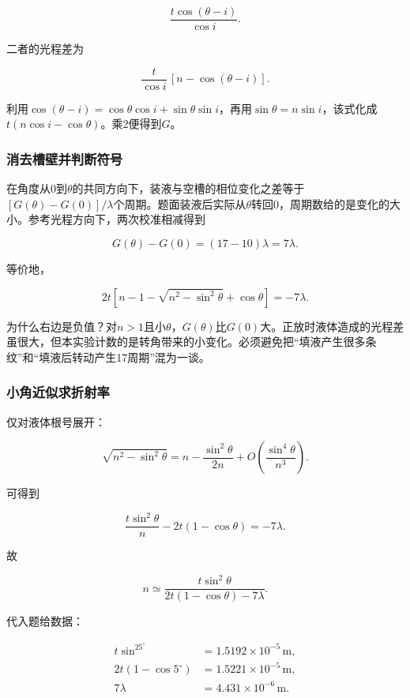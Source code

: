 \documentclass[12pt,a4paper,fontset=fandol]{ctexart}
\begin{document}
\[
\frac{t\cos(\theta-i)}{\cos i}.
\]

二者的光程差为

\[
\frac{t}{\cos i}\,[n-\cos(\theta-i)].
\]

利用\(\cos(\theta-i)=\cos\theta\cos i+\sin\theta\sin i\)，再用\(\sin\theta=n\sin i\)，该式化成\(t(n\cos i-\cos\theta)\)。乘2便得到\(G\)。

\subsubsection{消去槽壁并判断符号}\label{ux6d88ux53bbux69fdux58c1ux5e76ux5224ux65adux7b26ux53f7}

在角度从0到\(\theta\)的共同方向下，装液与空槽的相位变化之差等于\([G(\theta)-G(0)]/\lambda\)个周期。题面装液后实际从\(\theta\)转回0，周期数给的是变化的大小。参考光程方向下，两次校准相减得到

\[
G(\theta)-G(0)=(17-10)\lambda=7\lambda.
\]

等价地，

\[
2t\left[n-1-\sqrt{n^2-\sin^2\theta}
+\cos\theta\right]=-7\lambda.
\]

为什么右边是负值？对\(n>1\)且小\(\theta\)，\(G(\theta)\)比\(G(0)\)大。正放时液体造成的光程差虽很大，但本实验计数的是转角带来的小变化。必须避免把``填液产生很多条纹''和``填液后转动产生17周期''混为一谈。

\subsubsection{小角近似求折射率}\label{ux5c0fux89d2ux8fd1ux4f3cux6c42ux6298ux5c04ux7387}

仅对液体根号展开：

\[
\sqrt{n^2-\sin^2\theta}
=n-\frac{\sin^2\theta}{2n}
+O\!\left(\frac{\sin^4\theta}{n^3}\right).
\]

可得到

\[
\frac{t\sin^2\theta}{n}
-2t(1-\cos\theta)=-7\lambda.
\]

故

\[
n\simeq\frac{t\sin^2\theta}
{2t(1-\cos\theta)-7\lambda}.
\]

代入题给数据：

\[
\begin{aligned}
t\sin^25^\circ&=1.5192\times10^{-5}\,\mathrm m,\\
2t(1-\cos5^\circ)&=1.5221\times10^{-5}\,\mathrm m,\\
7\lambda&=4.431\times10^{-6}\,\mathrm m.
\end{aligned}
\]
\end{document}
